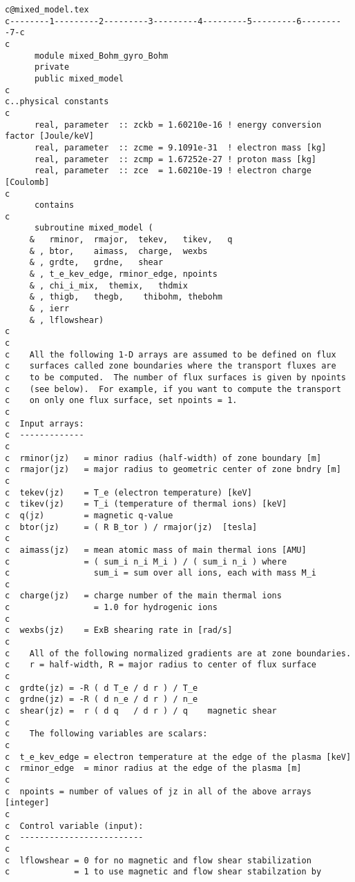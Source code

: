\begin{verbatim}
c@mixed_model.tex
c--------1---------2---------3---------4---------5---------6---------7-c
c
      module mixed_Bohm_gyro_Bohm
      private
      public mixed_model
c
c..physical constants
c
      real, parameter  :: zckb = 1.60210e-16 ! energy conversion factor [Joule/keV]
      real, parameter  :: zcme = 9.1091e-31  ! electron mass [kg]
      real, parameter  :: zcmp = 1.67252e-27 ! proton mass [kg]
      real, parameter  :: zce  = 1.60210e-19 ! electron charge [Coulomb]
c
      contains
c
      subroutine mixed_model (
     &   rminor,  rmajor,  tekev,   tikev,   q
     & , btor,    aimass,  charge,  wexbs
     & , grdte,   grdne,   shear
     & , t_e_kev_edge, rminor_edge, npoints
     & , chi_i_mix,  themix,   thdmix
     & , thigb,   thegb,    thibohm, thebohm
     & , ierr
     & , lflowshear)
c
c
c    All the following 1-D arrays are assumed to be defined on flux
c    surfaces called zone boundaries where the transport fluxes are
c    to be computed.  The number of flux surfaces is given by npoints
c    (see below).  For example, if you want to compute the transport
c    on only one flux surface, set npoints = 1.
c
c  Input arrays:
c  -------------
c
c  rminor(jz)   = minor radius (half-width) of zone boundary [m]
c  rmajor(jz)   = major radius to geometric center of zone bndry [m]
c
c  tekev(jz)    = T_e (electron temperature) [keV]
c  tikev(jz)    = T_i (temperature of thermal ions) [keV]
c  q(jz)        = magnetic q-value
c  btor(jz)     = ( R B_tor ) / rmajor(jz)  [tesla]
c
c  aimass(jz)   = mean atomic mass of main thermal ions [AMU]
c               = ( sum_i n_i M_i ) / ( sum_i n_i ) where
c                 sum_i = sum over all ions, each with mass M_i
c
c  charge(jz)   = charge number of the main thermal ions
c                 = 1.0 for hydrogenic ions
c
c  wexbs(jz)    = ExB shearing rate in [rad/s]
c
c    All of the following normalized gradients are at zone boundaries.
c    r = half-width, R = major radius to center of flux surface
c
c  grdte(jz) = -R ( d T_e / d r ) / T_e
c  grdne(jz) = -R ( d n_e / d r ) / n_e
c  shear(jz) =  r ( d q   / d r ) / q    magnetic shear
c
c    The following variables are scalars:
c
c  t_e_kev_edge = electron temperature at the edge of the plasma [keV]
c  rminor_edge  = minor radius at the edge of the plasma [m]
c
c  npoints = number of values of jz in all of the above arrays [integer]
c
c  Control variable (input):
c  -------------------------
c
c  lflowshear = 0 for no magnetic and flow shear stabilization
c             = 1 to use magnetic and flow shear stabilzation by

\end{verbatim}

